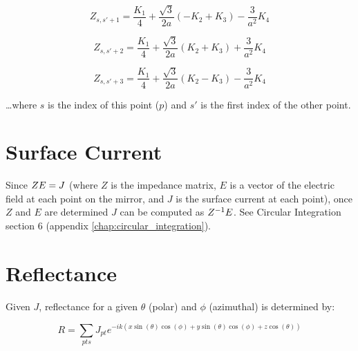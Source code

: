 \documentclass[etd,senior,noacknowledgments]{BYUPhys}
\begin{document}
\begin{equation}
  Z_{s,s'+1}=\frac{K_{1}}{4}+\frac{\sqrt{3}}{2a}\left(-K_{2}+K_{3}\right)-\frac{3}{a^{2}}K_{4}
\end{equation}

\begin{equation}
  Z_{s,s'+2}=\frac{K_{1}}{4}+\frac{\sqrt{3}}{2a}\left(K_{2}+K_{3}\right)+\frac{3}{a^{2}}K_{4}
\end{equation}

\begin{equation}
  Z_{s,s'+3}=\frac{K_{1}}{4}+\frac{\sqrt{3}}{2a}\left(K_{2}-K_{3}\right)-\frac{3}{a^{2}}K_{4}
\end{equation}

\ldots where $s$ is the index of this point ($p$) and $s'$ is the first index of the other point.







\section{Surface Current} \label{sec:current}

Since $Z \space E = J$ (where $Z$ is the impedance matrix, $E$ is a vector of the electric field at each point on the mirror, and $J$ is the surface current at each point), once $Z$ and $E$ are determined $J$ can be computed as $Z^{-1} \space E$. See Circular Integration section 6 (appendix \ref{chap:circular_integration}).



\section{Reflectance} \label{sec:reflectance}

Given $J$, reflectance for a given $\theta$ (polar) and $\phi$ (azimuthal) is determined by:

\begin{equation}
  R=\sum_{pts}J_{pt}e^{-ik\left(x\sin\left(\theta\right)\cos\left(\phi\right)+y\sin\left(\theta\right)\cos\left(\phi\right)+z\cos\left(\theta\right)\right)}
\end{equation}
\end{document}
